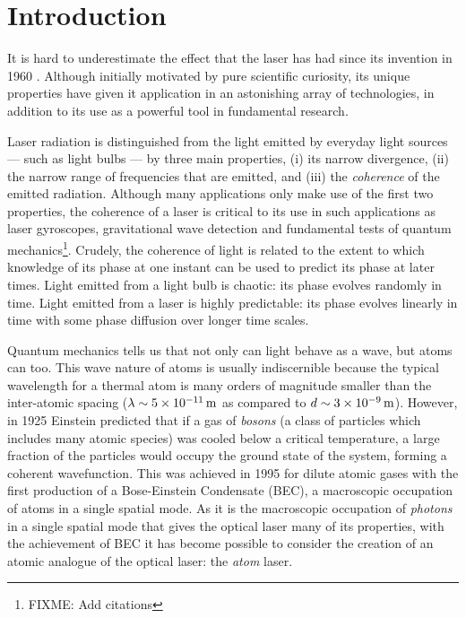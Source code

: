 \chapter{Introduction}
\label{Introduction}
\graphicspath{{Figures/Introduction/}{Figures/Common/}}

It is hard to underestimate the effect that the laser has had since its invention in 1960 \citep{Maiman:1960}.  Although initially motivated by pure scientific curiosity, its unique properties have given it application in an astonishing array of technologies, in addition to its use as a powerful tool in fundamental research.  

Laser radiation is distinguished from the light emitted by everyday light sources --- such as light bulbs --- by three main properties, (i) its narrow divergence, (ii) the narrow range of frequencies that are emitted, and (iii) the \emph{coherence} of the emitted radiation.  Although many applications only make use of the first two properties, the coherence of a laser is critical to its use in such applications as laser gyroscopes, gravitational wave detection and fundamental tests of quantum mechanics\footnote{FIXME: Add citations}.  Crudely, the coherence of light is related to the extent to which knowledge of its phase at one instant can be used to predict its phase at later times.  Light emitted from a light bulb is chaotic: its phase evolves randomly in time.  Light emitted from a laser is highly predictable: its phase evolves linearly in time with some phase diffusion over longer time scales.  

Quantum mechanics tells us that not only can light behave as a wave, but atoms can too.  This wave nature of atoms is usually indiscernible because the typical wavelength for a thermal atom is many orders of magnitude smaller than the inter-atomic spacing ($\lambda \sim 5 \times\unit[10^{-11}]{m}$ as compared to $d \sim 3 \times\unit[10^{-9}]{m}$).  However, in 1925 Einstein predicted \citep{Einstein:1925} that if a gas of \emph{bosons} (a class of particles which includes many atomic species) was cooled below a critical temperature, a large fraction of the particles would occupy the ground state of the system, forming a coherent wavefunction.  This was achieved in 1995 for dilute atomic gases \citep{Anderson:1995vn,Bradley:1995ys,Davis:1995} with the first production of a Bose-Einstein Condensate (BEC), a macroscopic occupation of atoms in a single spatial mode.  As it is the macroscopic occupation of \emph{photons} in a single spatial mode that gives the optical laser many of its properties, with the achievement of BEC it has become possible to consider the creation of an atomic analogue of the optical laser: the \emph{atom} laser.


